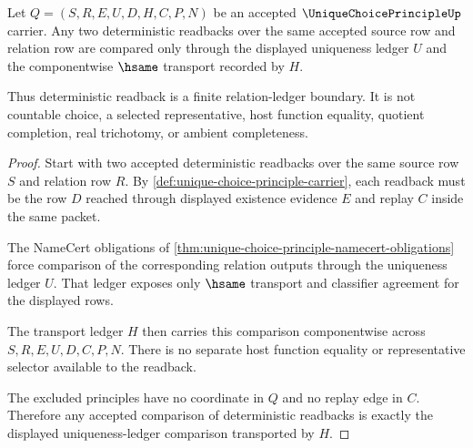 \begin{theorem}
\label{thm:unique-choice-principle-deterministic-readback}
Let $Q=(S,R,E,U,D,H,C,P,N)$ be an accepted $\UniqueChoicePrincipleUp$ carrier. Any two deterministic readbacks over the same accepted source row and relation row are compared only through the displayed uniqueness ledger $U$ and the componentwise $\hsame$ transport recorded by $H$.

Thus deterministic readback is a finite relation-ledger boundary. It is not countable choice, a selected representative, host function equality, quotient completion, real trichotomy, or ambient completeness.
\end{theorem}
\begin{proof}
Start with two accepted deterministic readbacks over the same source row $S$ and relation row $R$. By \autoref{def:unique-choice-principle-carrier}, each readback must be the row $D$ reached through displayed existence evidence $E$ and replay $C$ inside the same packet.

The NameCert obligations of \autoref{thm:unique-choice-principle-namecert-obligations} force comparison of the corresponding relation outputs through the uniqueness ledger $U$. That ledger exposes only $\hsame$ transport and classifier agreement for the displayed rows.

The transport ledger $H$ then carries this comparison componentwise across $S,R,E,U,D,C,P,N$. There is no separate host function equality or representative selector available to the readback.

The excluded principles have no coordinate in $Q$ and no replay edge in $C$. Therefore any accepted comparison of deterministic readbacks is exactly the displayed uniqueness-ledger comparison transported by $H$.
\end{proof}

